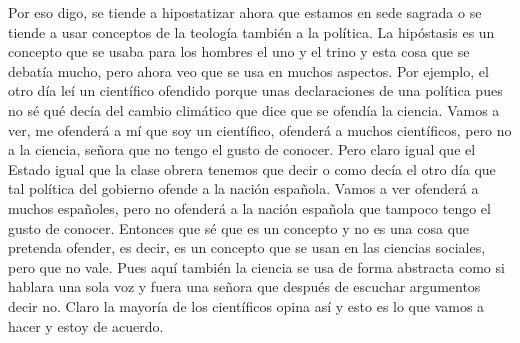 Por eso digo, se tiende a hipostatizar ahora que estamos en sede sagrada o se tiende a usar conceptos de la teología también a la política. La hipóstasis es un concepto que se usaba para los hombres el uno y el trino y esta cosa que se debatía mucho, pero ahora veo que se usa en muchos aspectos. Por ejemplo, el otro día leí un científico ofendido porque unas declaraciones de una política pues no sé qué decía del cambio climático que dice que se ofendía la ciencia. Vamos a ver, me ofenderá a mí que soy un científico, ofenderá a muchos científicos, pero no a la ciencia, señora que no tengo el gusto de conocer. Pero claro igual que el Estado igual que la clase obrera tenemos que decir o como decía el otro día que tal política del gobierno ofende a la nación española. Vamos a ver ofenderá a muchos españoles, pero no ofenderá a la nación española que tampoco tengo el gusto de conocer. Entonces que sé que es un concepto y no es una cosa que pretenda ofender, es decir, es un concepto que se usan en las ciencias sociales, pero que no vale. Pues aquí también la ciencia se usa de forma abstracta como si hablara una sola voz y fuera una señora que después de escuchar argumentos decir no. Claro la mayoría de los científicos opina así y esto es lo que vamos a hacer y estoy de acuerdo.

